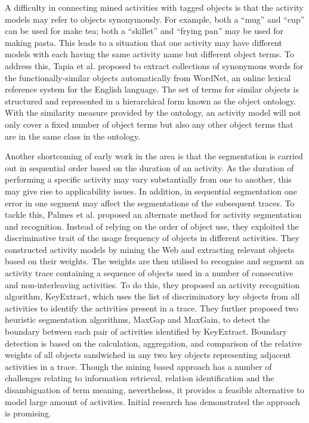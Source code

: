 A difficulty in connecting mined activities with tagged objects \cite{Perkowitz2004} \cite{Wyatt2005} is that the activity models may refer to objects synonymously. For example, both a “mug” and “cup” can be used for make tea; both a “skillet” and “frying pan” may be used for making pasta. This leads to a situation that one activity may have different models with each having the same activity name but different object terms. To address this, Tapia et al. \cite{Tapia2006} proposed to extract collections of synonymous words for the functionally-similar objects automatically from WordNet, an online lexical reference system for the English language. The set of terms for similar objects is structured and represented in a hierarchical form known as the object ontology. With the similarity measure provided by the ontology, an activity model will not only cover a fixed number of object terms but also any other object terms that are in the same class in the ontology. 

Another shortcoming of early work in the area \cite{Perkowitz2004} \cite{Wyatt2005} is that the segmentation is carried out in sequential order based on the duration of an activity. As the duration of performing a specific activity may vary substantially from one to another, this may give rise to applicability issues. In addition, in sequential segmentation one error in one segment may affect the segmentations of the subsequent traces. To tackle this, Palmes et al. \cite{Palmes2010} proposed an alternate method for activity segmentation and recognition. Instead of relying on the order of object use, they exploited the discriminative trait of the usage frequency of objects in different activities. They constructed activity models by mining the Web and extracting relevant objects based on their weights. The weights are then utilised to recognise and segment an activity trace containing a sequence of objects used in a number of consecutive and non-interleaving activities. To do this, they proposed an activity recognition algorithm, KeyExtract, which uses the list of discriminatory key objects from all activities to identify the activities present in a trace. They further proposed two heuristic segmentation algorithms, MaxGap and MaxGain, to detect the boundary between each pair of activities identified by KeyExtract. Boundary detection is based on the calculation, aggregation, and comparison of the relative weights of all objects sandwiched in any two key objects representing adjacent activities in a trace. Though the mining based approach has a number of challenges relating to information retrieval, relation identification and the disambiguation of term meaning, nevertheless, it provides a feasible alternative to model large amount of activities. Initial research has demonstrated the approach is promising. 

